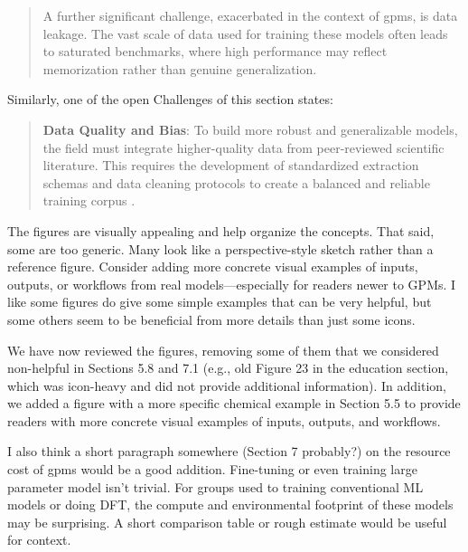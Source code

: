 \begin{reply}
\begin{quote}
    A further significant challenge, exacerbated in the context of \glspl{gpm}, is data leakage. The vast scale of data used for training these models often leads to saturated benchmarks, where high performance may reflect memorization rather than genuine generalization.
\end{quote}

Similarly, one of the open Challenges of this section states:

\begin{quote}
    \textbf{Data Quality and Bias}: To build more robust and generalizable models, the field must integrate higher-quality data from peer-reviewed scientific literature. This requires the development of standardized extraction schemas and data cleaning protocols to create a balanced and reliable training corpus \autocite{rios2025llm, mehr2020universal}.
\end{quote}

\end{reply}

\begin{point}
The figures are visually appealing and help organize the concepts. That said, some are too generic. Many look like a perspective-style sketch rather than a reference figure. Consider adding more concrete visual examples of inputs, outputs, or workflows from real models—especially for readers newer to GPMs. I like some figures do give some simple examples that can be very helpful, but some others seem to be beneficial from more details than just some icons.
\end{point}

\begin{reply}
We have now reviewed the figures, removing some of them that we considered non-helpful in Sections 5.8 and 7.1 (e.g., old Figure 23 in the education section, which was icon-heavy and did not provide additional information). In addition, we added a figure with a more specific chemical example in Section 5.5 to provide readers with more concrete visual examples of inputs, outputs, and workflows.
\end{reply}

\begin{point}
I also think a short paragraph somewhere (Section 7 probably?) on the resource cost of \glspl{gpm} would be a good addition. Fine-tuning or even training large parameter model isn't trivial. For groups used to training conventional ML models or doing DFT, the compute and environmental footprint of these models may be surprising. A short comparison table or rough estimate would be useful for context.
\end{point}

